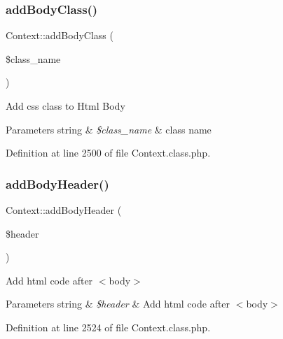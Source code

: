 \mbox{\label{classContext_ad266c6556167746e9368c4b1a7f6b16b}} 
\subsubsection{\texorpdfstring{add\+Body\+Class()}{addBodyClass()}}
{\footnotesize\ttfamily Context\+::add\+Body\+Class (\begin{DoxyParamCaption}\item[{}]{\$class\+\_\+name }\end{DoxyParamCaption})}

Add css class to Html Body


\begin{DoxyParams}[1]{Parameters}
string & {\em \$class\+\_\+name} & class name \\
\hline
\end{DoxyParams}


Definition at line 2500 of file Context.\+class.\+php.

\mbox{\label{classContext_ae7c9dad9ccd3e410283e21c67f395114}} 
\subsubsection{\texorpdfstring{add\+Body\+Header()}{addBodyHeader()}}
{\footnotesize\ttfamily Context\+::add\+Body\+Header (\begin{DoxyParamCaption}\item[{}]{\$header }\end{DoxyParamCaption})}

Add html code after $<$body$>$


\begin{DoxyParams}[1]{Parameters}
string & {\em \$header} & Add html code after $<$body$>$ \\
\hline
\end{DoxyParams}


Definition at line 2524 of file Context.\+class.\+php.

\mbox{\label{classContext_ac08df39b79aca5d52cc5d45adba5d3a6}} 
